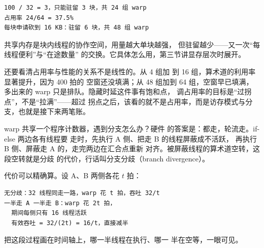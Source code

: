 \begin{lstlisting}
100 / 32 = 3，只能驻留 3 块，共 24 组 warp
占用率 24/64 = 37.5%
每块申请砍到 16 KB：驻留 6 块，共 48 组 warp
\end{lstlisting}

共享内存是块内线程的协作空间，用量越大单块越强，
但驻留越少——又一次“每线程便利”与“在途数量”
的交换。它具体怎么用，第三节讲显存层次时展开。

还要看清占用率与性能的关系不是线性的。从 4 组加
到 16 组，算术道的利用率显著提升，因为 400 拍的
空窗还没填满；从 48 组加到 64 组，空窗早已填满，
多出来的 warp 只是排队。隐藏时延这件事有饱和点，
调占用率的目标是“过拐点”，不是“拉满”——超过
拐点之后，该看的就不是占用率，而是访存模式与分
支，也就是接下来两笔账。

warp 共享一个程序计数器，遇到分支怎么办？硬件
的答案是：都走，轮流走。if-else 两边各有线程要
走时，先执行 A 侧、把走 B 的线程屏蔽成不活跃，
再执行 B 侧、屏蔽走 A 的，走完两边在汇合点重新
对齐。被屏蔽线程的算术道空转，这段空转就是分歧
的代价，行话叫分支分歧（branch divergence）。

代价可以精确算。设 A、B 两侧各花 $t$ 拍：

\begin{lstlisting}
无分歧：32 线程同走一路，warp 花 t 拍，吞吐 32/t
一半走 A 一半走 B：warp 花 2t 拍，
  期间每侧只有 16 线程活跃
  有效吞吐 = 32/(2t) = 16/t，直接减半
\end{lstlisting}

把这段过程画在时间轴上，哪一半线程在执行、哪一
半在空等，一眼可见。

